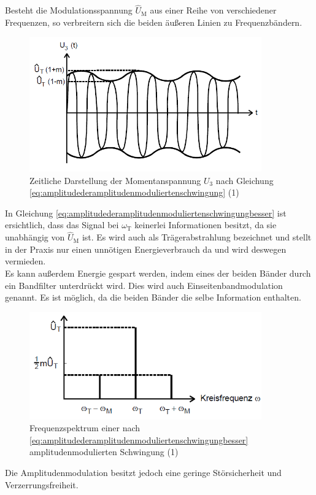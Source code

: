 \documentclass[]{scrartcl}
\begin{document}
Besteht die Modulationsspannung $\hat{U}_\text{M}$ aus einer Reihe von verschiedener Frequenzen, so verbreitern sich die beiden äußeren Linien zu Frequenzbändern.\\
\begin{figure}[H]
\centering 
\includegraphics[width=10cm]{images/zeitabhaengigkeit_momentanspannung.png}
\caption{Zeitliche Darstellung der Momentanspannung $U_3$ nach Gleichung \ref{eq:amplitudederamplitudenmoduliertenschwingung} (1)}
\label{fig:zeitabhaengigkeit_momentanspannung}
\end{figure}
In Gleichung \ref{eq:amplitudederamplitudenmoduliertenschwingungbesser} ist ersichtlich, dass das Signal bei $\omega_\text{T}$ keinerlei Informationen besitzt, da sie unabhängig von $\hat{U}_\text{M}$ ist. Es wird auch als Trägerabstrahlung bezeichnet und stellt in der Praxis nur einen unnötigen Energieverbrauch da und wird deswegen vermieden.\\
Es kann außerdem Energie gespart werden, indem eines der beiden Bänder durch ein Bandfilter unterdrückt wird. Dies wird auch Einseitenbandmodulation genannt. Es ist möglich, da die beiden Bänder die selbe Information enthalten.
\begin{figure}[H]
\centering 
\includegraphics[width=10cm]{images/frequenzsprektum_amplitudenmodulierten.png}
\caption{Frequenzspektrum einer nach \ref{eq:amplitudederamplitudenmoduliertenschwingungbesser} amplitudenmodulierten Schwingung (1)}
\label{fig:frequenzsprektum_amplitudenmodulierten}
\end{figure}
Die Amplitudenmodulation besitzt jedoch eine geringe Störsicherheit und Verzerrungsfreiheit.
\end{document}

